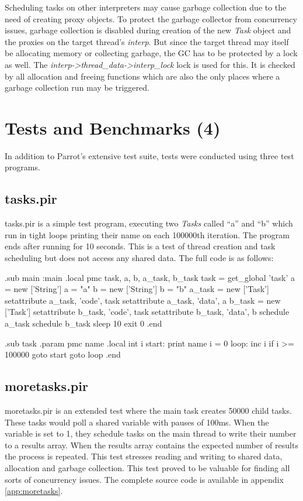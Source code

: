 \documentclass[bachelor,english]{hgbthesis}
\begin{document}
Scheduling tasks on other interpreters may cause garbage collection due to the need of creating proxy objects. To protect the garbage collector from concurrency issues, garbage collection is disabled during creation of the new \textit{Task} object and the proxies on the target thread's \textit{interp}. But since the target thread may itself be allocating memory or collecting garbage, the GC has to be protected by a lock as well. The \textit{interp->thread\_data->interp\_lock} lock is used for this. It is checked by all allocation and freeing functions which are also the only places where a garbage collection run may be triggered.

\chapter{Tests and Benchmarks (4)}

In addition to Parrot's extensive test suite, tests were conducted using three test programs.

\section{tasks.pir}

tasks.pir is a simple test program, executing two \textit{Tasks} called ``a'' and ``b'' which run in tight loops printing their name on each 100000th iteration. The program ends after running for 10 seconds. This is a test of thread creation and task scheduling but does not access any shared data. The full code is as follows:
%
\begin{GenericCode}
.sub main :main
    .local pmc task, a, b, a_task, b_task
    task = get_global 'task'
    a = new ['String']
    a = "a"
    b = new ['String']
    b = "b"
    a_task = new ['Task']
    setattribute a_task, 'code', task
    setattribute a_task, 'data', a
    b_task = new ['Task']
    setattribute b_task, 'code', task
    setattribute b_task, 'data', b
    schedule a_task
    schedule b_task
    sleep 10
    exit 0
.end

.sub task
    .param pmc name
    .local int i
start:
    print name
    i = 0
loop:
    inc i
    if i >= 100000 goto start
    goto loop
.end
\end{GenericCode}

\section{moretasks.pir}

moretasks.pir is an extended test where the main task creates 50000 child tasks. These tasks would poll a shared variable with pauses of 100ms. When the variable is set to 1, they schedule tasks on the main thread to write their number to a results array. When the results array contains the expected number of results the process is repeated. This test stresses reading and writing to shared data, allocation and garbage collection. This test proved to be valuable for finding all sorts of concurrency issues. The complete source code is available in appendix \ref{app:moretasks}.
\end{document}
